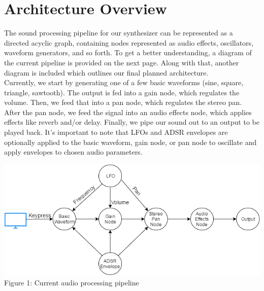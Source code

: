 \documentclass[a4paper, 12pt]{article}
\begin{document}
\section*{Architecture Overview}
The sound processing pipeline for our synthesizer can be represented as a directed acyclic graph, containing nodes represented as audio effects, oscillators, waveform generators, and so forth. To get a better understanding, a diagram of the current pipeline is provided on the next page. Along with that, another diagram is included which outlines our final planned architecture.\\
 Currently, we start by generating one of a few basic waveforms (sine, square, triangle, sawtooth). The output is fed into a gain node, which regulates the volume. Then, we feed that into a pan node, which regulates the stereo pan. After the pan node, we feed the signal into an audio effects node, which applies effects like reverb and/or delay. Finally, we pipe our sound out to an output to be played back. It's important to note that LFOs and ADSR envelopes are optionally applied to the basic waveform, gain node, or pan node to oscillate and apply envelopes to chosen audio parameters.
 \newpage

\null
\vfill
\begin{center}
\includegraphics[scale=0.75]{architecture1.png}
Figure 1: Current audio processing pipeline
\end{center}
\vfill
\end{document}
